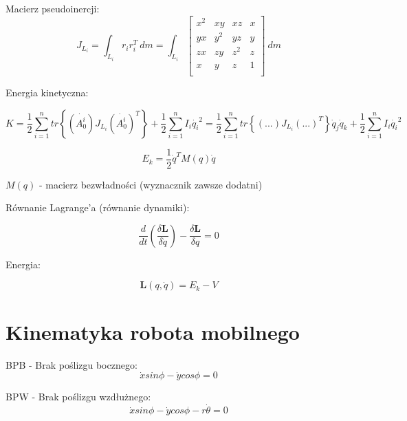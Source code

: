 \documentclass{article}
\newenvironment{kol2}{\noindent \begin{minipage}[t]{0.5\linewidth}}{\end{minipage}}
\begin{document}
\vspace{0.5cm} \noindent
Macierz pseudoinercji:
\Large
$$  J_{L_i} = \int_{L_i} r_i r_i^T\ dm
    = \int_{L_i} \left[ \begin{matrix}
        x^2     &   xy  &   xz  &   x   \\
        yx      &   y^2 &   yz  &   y   \\
        zx      &   zy  &   z^2 &   z   \\
        x       &   y   &   z   &   1   \\
    \end{matrix} \right] \ dm
$$
\normalsize

\noindent
Energia kinetyczna:

$$  K = \frac12 \sum_{i=1}^n tr\left\{ (\dot{A_0^i}) J_{L_i} (\dot{A_0^i})^T \right\}
+ \frac12 \sum_{i=1}^n I_i \dot{q_i}^2
= \frac12 \sum_{i=1}^n tr\left\{ (...) J_{L_i} (...)^T \right\} \dot{q}_j \dot{q}_k
+ \frac12 \sum_{i=1}^n I_i \dot{q_i}^2
$$

\Large
$$ E_k = \frac12 \dot{q}^T M(q) \dot{q} $$
\normalsize

$ M(q) $ - macierz bezwładności (wyznacznik zawsze dodatni)

\vspace{1cm}
\begin{kol2}
    Równanie Lagrange'a (równanie dynamiki):

    \Large
    $$ \frac{d}{dt} \left( \frac{\delta \textbf{L}}{\delta \dot{q}} \right) - \frac{\delta \textbf{L}}{\delta q} = 0 $$
    \normalsize
\end{kol2}
\begin{kol2}
    Energia:

    \Large
    $$ \textbf{L}(q,\dot{q}) = E_k - V $$
    \normalsize
\end{kol2}

\newpage
\section{Kinematyka robota mobilnego}

\begin{kol2}
    BPB - Brak poślizgu bocznego:
    \Large
    $$ \dot{x} sin \phi - \dot{y} cos \phi = 0 $$
    \normalsize
\end{kol2}
\begin{kol2}
    BPW - Brak poślizgu wzdłużnego:
    \Large
    $$ \dot{x} sin \phi - \dot{y} cos \phi - r \dot{\theta} = 0 $$
    \normalsize
\end{kol2}
\end{document}
